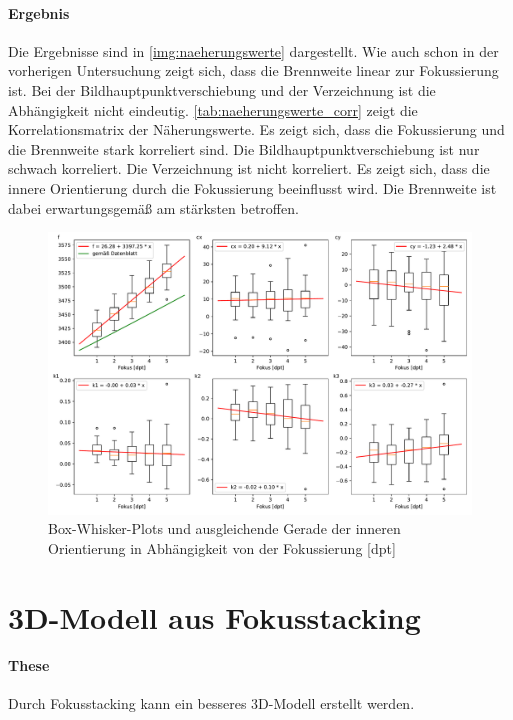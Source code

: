 \documentclass[./00PhotoBox.tex]{subfiles}
\begin{document}
\paragraph{Ergebnis}

Die Ergebnisse sind in \autoref{img:naeherungswerte} dargestellt. Wie auch schon in der vorherigen Untersuchung zeigt sich, dass die Brennweite linear zur Fokussierung ist. Bei der Bildhauptpunktverschiebung und der Verzeichnung ist die Abhängigkeit nicht eindeutig. \autoref{tab:naeherungswerte_corr} zeigt die Korrelationsmatrix der Näherungswerte. Es zeigt sich, dass die Fokussierung und die Brennweite stark korreliert sind. Die Bildhauptpunktverschiebung ist nur schwach korreliert. Die Verzeichnung ist nicht korreliert. Es zeigt sich, dass die innere Orientierung durch die Fokussierung beeinflusst wird. Die Brennweite ist dabei erwartungsgemäß am stärksten betroffen.

\begin{figure}
    \centering
    \includegraphics[width=1\textwidth]{./img/naeherungswerte_diagramm.pdf}
    \centering
    \caption{Box-Whisker-Plots und ausgleichende Gerade der inneren Orientierung in Abhängigkeit von der Fokussierung [dpt]} %
    \label{img:naeherungswerte} %
\end{figure}



\section{3D-Modell aus Fokusstacking}

\paragraph{These}
Durch Fokusstacking kann ein besseres 3D-Modell erstellt werden.
\end{document}
